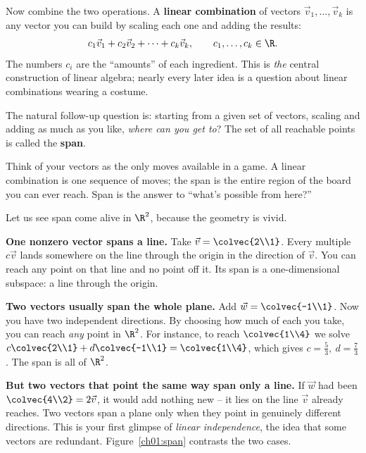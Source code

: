 Now combine the two operations. A \textbf{linear combination} of vectors $\vec v_1,\dots,\vec v_k$ is
any vector you can build by scaling each one and adding the results:
\[
c_1\vec v_1 + c_2 \vec v_2 + \dots + c_k \vec v_k,
\qquad c_1,\dots,c_k \in \R.
\]
The numbers $c_i$ are the ``amounts'' of each ingredient. This is \emph{the} central construction of
linear algebra; nearly every later idea is a question about linear combinations wearing a costume.

The natural follow-up question is: starting from a given set of vectors, scaling and adding as much as
you like, \emph{where can you get to}? The set of all reachable points is called the \textbf{span}.

\begin{intuitionbox}
Think of your vectors as the only moves available in a game. A linear combination is one sequence of
moves; the span is the entire region of the board you can ever reach. Span is the answer to
``what's possible from here?''
\end{intuitionbox}

Let us see span come alive in $\R^2$, because the geometry is vivid.

\textbf{One nonzero vector spans a line.} Take $\vec v = \colvec{2\\1}$. Every multiple $c\vec v$ lands
somewhere on the line through the origin in the direction of $\vec v$. You can reach any point on that
line and no point off it. Its span is a one-dimensional subspace: a line through the origin.

\textbf{Two vectors usually span the whole plane.} Add $\vec w = \colvec{-1\\1}$. Now you have two
independent directions. By choosing how much of each you take, you can reach \emph{any} point in
$\R^2$. For instance, to reach $\colvec{1\\4}$ we solve $c\colvec{2\\1}+d\colvec{-1\\1}=\colvec{1\\4}$,
which gives $c=\tfrac53,\ d=\tfrac73$. The span is all of $\R^2$.

\textbf{But two vectors that point the same way span only a line.} If $\vec w$ had been
$\colvec{4\\2}=2\vec v$, it would add nothing new -- it lies on the line $\vec v$ already reaches. Two
vectors span a plane only when they point in genuinely different directions. This is your first
glimpse of \emph{linear independence}, the idea that some vectors are redundant.
Figure~\ref{ch01:span} contrasts the two cases.


